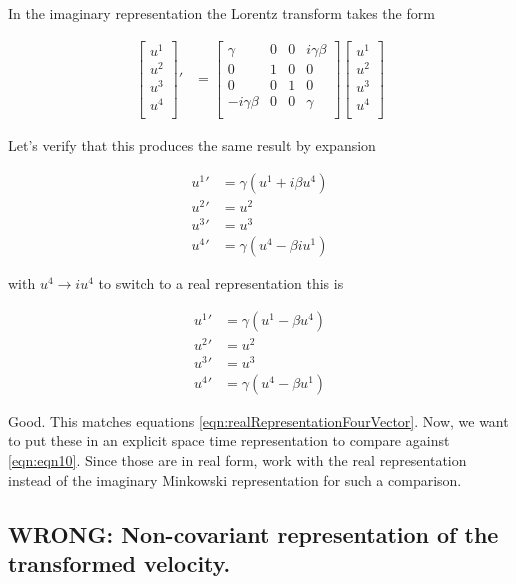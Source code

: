 \documentclass{article}
\begin{document}
In the imaginary representation the Lorentz transform takes the form

\begin{align*}
{\begin{bmatrix}
u^1 \\
u^2 \\
u^3 \\
u^4 \\
\end{bmatrix}}'
&=
\begin{bmatrix}
\gamma & 0 & 0 & i \gamma \beta \\
0 & 1 & 0 & 0 \\
0 & 0 & 1 & 0 \\
- i \gamma \beta & 0 & 0 & \gamma \\
\end{bmatrix}
{\begin{bmatrix}
u^1 \\
u^2 \\
u^3 \\
u^4 \\
\end{bmatrix}} 
\end{align*}

Let's verify that this produces the same result by expansion

\begin{align*}
{u^1}' &= \gamma ( u^1 + i \beta u^4) \\
{u^2}' &= {u^2} \\
{u^3}' &= {u^3} \\
{u^4}' &= \gamma ( u^4 - \beta i u^1)
\end{align*}

with $u^4 \rightarrow i u^4$ to switch to a real representation this is

\begin{align*}
{u^1}' &= \gamma ( u^1 - \beta u^4) \\
{u^2}' &= {u^2} \\
{u^3}' &= {u^3} \\
{u^4}' &= \gamma ( u^4 - \beta u^1)
\end{align*}

Good.  This matches equations \ref{eqn:realRepresentationFourVector}.  Now, we want to put these in an explicit space time representation
to compare against \ref{eqn:eqn10}.  Since those are in real form, work with the real representation instead of the imaginary Minkowski
representation for such a comparison.

\subsection{WRONG: Non-covariant representation of the transformed velocity. }
\end{document}
